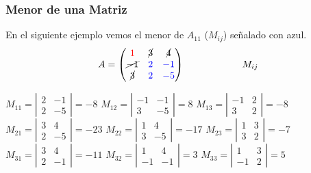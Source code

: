 \documentclass[stu, 12pt, letterpaper, donotrepeattitle, floatsintext, natbib]{apa7}
\begin{document}
    \subsubsection{Menor de una Matriz}
    En el siguiente ejemplo vemos el menor de $A_{11}$ ($M_{ij}$) señalado con azul.
    \[A=\begin{pmatrix}
            \color{red}1 & \cancel{3}    & \cancel{4}     \\
            \cancel{-1}  & \color{blue}2 & \color{blue}-1 \\
            \cancel{3}   & \color{blue}2 & \color{blue}-5
    \end{pmatrix}    \qquad \qquad \qquad    M_{ij}\]

    $M_{11}=\left| \begin{matrix}
                       2 & -1 \\ 2 & -5
    \end{matrix} \right| = -8$
    \qquad
    $M_{12}=\left| \begin{matrix}
                       -1 & -1 \\ 3 & -5
    \end{matrix} \right| = 8$
    \qquad
    $M_{13}=\left| \begin{matrix}
                       -1 & 2 \\ 3 & 2
    \end{matrix} \right| = -8$ \\[0.4cm]


    $M_{21}=\left| \begin{matrix}
                       3 & 4 \\ 2 & -5
    \end{matrix} \right| = -23$
    \qquad
    $M_{22}=\left| \begin{matrix}
                       1 & 4 \\ 3 & -5
    \end{matrix} \right| = -17$
    \qquad
    $M_{23}=\left| \begin{matrix}
                       1 & 3 \\ 3 & 2
    \end{matrix} \right| = -7$\\[0.4cm]


    $M_{31}=\left| \begin{matrix}
                       3 & 4 \\ 2 & -1
    \end{matrix} \right| = -11$
    \qquad
    $M_{32}=\left| \begin{matrix}
                       1 & 4 \\ -1 & -1
    \end{matrix} \right| = 3$
    \qquad
    $M_{33}=\left| \begin{matrix}
                       1 & 3 \\ -1 & 2
    \end{matrix} \right| = 5$ \\
\end{document}
